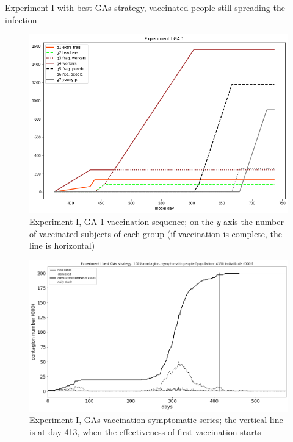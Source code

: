\documentclass[8pt]{beamer}
\begin{document}
\begin{frame}{Experiment I with best GAs strategy, vaccinated people still spreading the infection}

\begin{figure}[H]
\center
\includegraphics[scale=0.14]{Experiment_I_GA_1_VaccinationSequence.png} %

\caption{Experiment I, GA 1 vaccination sequence; on the $y$ axis the number of vaccinated subjects of each group (if vaccination is complete, the line is horizontal)} 
\label{Experiment_I_GA1VaccinationSequence}
\end{figure}

\begin{figure}[H]
\center
\includegraphics[scale=0.16]{Experiment_I_1_GAs_symptomatic_series.png} 

\caption{Experiment I, GAs vaccination symptomatic series; the vertical line is at day 413, when the effectiveness of first vaccination starts} 
\label{Experiment_I_GAs1SymptomaticSeries}
\end{figure}


\end{frame}
\end{document}
